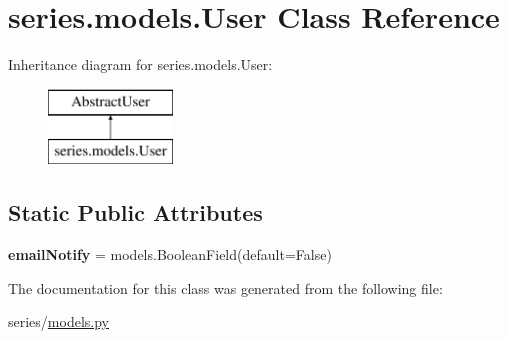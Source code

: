 \hypertarget{classseries_1_1models_1_1_user}{}\section{series.\+models.\+User Class Reference}
\label{classseries_1_1models_1_1_user}
Inheritance diagram for series.\+models.\+User\+:\begin{figure}[H]
\begin{center}
\leavevmode
\includegraphics[height=2.000000cm]{classseries_1_1models_1_1_user}
\end{center}
\end{figure}
\subsection*{Static Public Attributes}
\begin{DoxyCompactItemize}
\item 
\mbox{\label{classseries_1_1models_1_1_user_a5f5206e69b6975fb89676b2e9e9cc2e2}} 
{\bfseries email\+Notify} = models.\+Boolean\+Field(default=False)
\end{DoxyCompactItemize}


The documentation for this class was generated from the following file\+:\begin{DoxyCompactItemize}
\item 
series/\mbox{\hyperlink{models_8py}{models.\+py}}\end{DoxyCompactItemize}
